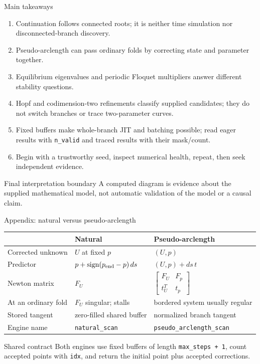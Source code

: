 \begin{frame}{Main takeaways}
\small
\begin{enumerate}
  \item Continuation follows connected roots; it is neither time simulation nor disconnected-branch discovery.
  \item Pseudo-arclength can pass ordinary folds by correcting state and parameter together.
  \item Equilibrium eigenvalues and periodic Floquet multipliers answer different stability questions.
  \item Hopf and codimension-two refinements classify supplied candidates; they do not switch branches or trace two-parameter curves.
  \item Fixed buffers make whole-branch JIT and batching possible; read eager results with \texttt{n\_valid} and traced results with their mask/count.
  \item Begin with a trustworthy seed, inspect numerical health, repeat, then seek independent evidence.
\end{enumerate}

\vfill
\begin{alertblock}{Final interpretation boundary}
A computed diagram is evidence about the supplied mathematical model, not automatic validation of the model or a causal claim.
\end{alertblock}
\end{frame}

\begin{frame}{Appendix: natural versus pseudo-arclength}
\small
\begin{center}
\begin{tabular}{p{}p{}p{}}
\toprule
 & Natural & Pseudo-arclength\\
\midrule
Corrected unknown & $U$ at fixed $p$ & $(U,p)$\\
Predictor & $p+\operatorname{sign}(p_{\rm end}-p)\,ds$ & $(U,p)+ds\,t$\\
Newton matrix & $F_U$ & $\begin{bmatrix}F_U&F_p\\t_U^T&t_p\end{bmatrix}$\\[3mm]
At an ordinary fold & $F_U$ singular; stalls & bordered system usually regular\\
Stored tangent & zero-filled shared buffer & normalized branch tangent\\
Engine name & \texttt{natural\_scan} & \texttt{pseudo\_arclength\_scan}\\
\bottomrule
\end{tabular}
\end{center}

\begin{block}{Shared contract}
Both engines use fixed buffers of length \texttt{max\_steps + 1}, count
accepted points with \texttt{idx}, and return the initial point plus accepted corrections.
\end{block}
\end{frame}

